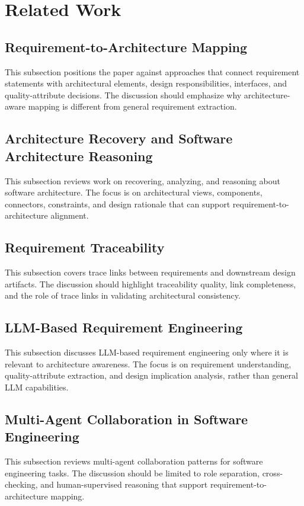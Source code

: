 \section{Related Work}
\label{related_work}

\subsection{Requirement-to-Architecture Mapping}
\label{sec:rw-ra-mapping}

This subsection positions the paper against approaches that connect requirement statements with architectural elements, design responsibilities, interfaces, and quality-attribute decisions.
The discussion should emphasize why architecture-aware mapping is different from general requirement extraction.

\subsection{Architecture Recovery and Software Architecture Reasoning}
\label{sec:rw-architecture-reasoning}

This subsection reviews work on recovering, analyzing, and reasoning about software architecture.
The focus is on architectural views, components, connectors, constraints, and design rationale that can support requirement-to-architecture alignment.

\subsection{Requirement Traceability}
\label{sec:rw-traceability}

This subsection covers trace links between requirements and downstream design artifacts.
The discussion should highlight traceability quality, link completeness, and the role of trace links in validating architectural consistency.

\subsection{LLM-Based Requirement Engineering}
\label{sec:rw-llm-re}

This subsection discusses LLM-based requirement engineering only where it is relevant to architecture awareness.
The focus is on requirement understanding, quality-attribute extraction, and design implication analysis, rather than general LLM capabilities.

\subsection{Multi-Agent Collaboration in Software Engineering}
\label{sec:rw-multi-agent}

This subsection reviews multi-agent collaboration patterns for software engineering tasks.
The discussion should be limited to role separation, cross-checking, and human-supervised reasoning that support requirement-to-architecture mapping.
